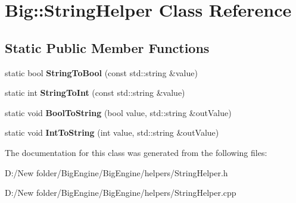 \hypertarget{class_big_1_1_string_helper}{}\section{Big\+:\+:String\+Helper Class Reference}
\label{class_big_1_1_string_helper}
\subsection*{Static Public Member Functions}
\begin{DoxyCompactItemize}
\item 
\mbox{\label{class_big_1_1_string_helper_a7721da7c384eb603bd0ac338924afcee}} 
static bool {\bfseries String\+To\+Bool} (const std\+::string \&value)
\item 
\mbox{\label{class_big_1_1_string_helper_a7b638da00ca998720ce6895efea1f5aa}} 
static int {\bfseries String\+To\+Int} (const std\+::string \&value)
\item 
\mbox{\label{class_big_1_1_string_helper_a7bd8f650e0e10d2a8da82a580839acd3}} 
static void {\bfseries Bool\+To\+String} (bool value, std\+::string \&out\+Value)
\item 
\mbox{\label{class_big_1_1_string_helper_ad67cba8ce64bf2520a5eac3f65215568}} 
static void {\bfseries Int\+To\+String} (int value, std\+::string \&out\+Value)
\end{DoxyCompactItemize}


The documentation for this class was generated from the following files\+:\begin{DoxyCompactItemize}
\item 
D\+:/\+New folder/\+Big\+Engine/\+Big\+Engine/helpers/String\+Helper.\+h\item 
D\+:/\+New folder/\+Big\+Engine/\+Big\+Engine/helpers/String\+Helper.\+cpp\end{DoxyCompactItemize}
